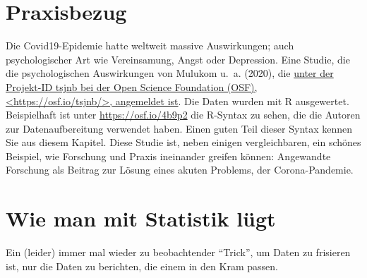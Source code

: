 \documentclass[
  a4paper,
  DIV=11]{scrreprt}
\theoremstyle{definition}
\theoremstyle{definition}
\theoremstyle{definition}
\theoremstyle{remark}
\begin{document}
\section{Praxisbezug}\label{praxisbezug-2}

Die Covid19-Epidemie hatte weltweit massive Auswirkungen; auch
psychologischer Art wie Vereinsamung, Angst oder Depression. Eine
Studie, die die psychologischen Auswirkungen von Mulukom u.~a. (2020),
die \href{https://osf.io/tsjnb/}{unter der Projekt-ID tsjnb bei der Open
Science Foundation (OSF), \textless https://osf.io/tsjnb/\textgreater,
angemeldet ist}. Die Daten wurden mit R ausgewertet. Beispielhaft ist
unter \url{https://osf.io/4b9p2} die R-Syntax zu sehen, die die Autoren
zur Datenaufbereitung verwendet haben. Einen guten Teil dieser Syntax
kennen Sie aus diesem Kapitel. Diese Studie ist, neben einigen
vergleichbaren, ein schönes Beispiel, wie Forschung und Praxis
ineinander greifen können: Angewandte Forschung als Beitrag zur Lösung
eines akuten Problems, der Corona-Pandemie.

\section{Wie man mit Statistik
lügt}\label{wie-man-mit-statistik-luxfcgt-1}

Ein (leider) immer mal wieder zu beobachtender ``Trick'', um Daten zu
frisieren ist, nur die Daten zu berichten, die einem in den Kram passen.
\end{document}
